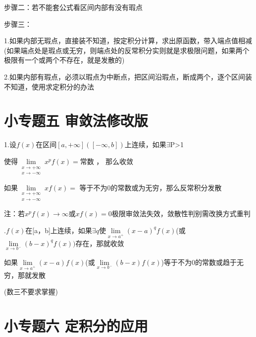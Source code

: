 \documentclass[a4paper,11pt]{book}
\begin{document}
\vspace{2ex}

\noindent 步骤二：若不能套公式看区间内部有没有瑕点

\noindent 步骤三：

1.如果内部无瑕点，直接装不知道，按定积分计算，求出原函数，带入端点值相减(如果端点处是瑕点或无穷，则端点处的反常积分实则就是求极限问题，如果两个极限有一个或两个不存在，就是发散的)

2.如果内部有瑕点，必须以瑕点为中断点，把区间沿瑕点，断成两个，逐个区间装不知道，使用求定积分的办法

\section*{小专题五 \quad 审敛法修改版}

1.设$f(x)$在区间$[a,+\infty]([-\infty,b])$上连续，如果$\exists$P>1

\vspace{2ex}

使得$\displaystyle{\lim \limits_{\substack{x \rightarrow+\infty\\x \rightarrow -\infty}} x^{p} f(x)=}$常数 ， 那么收敛

\vspace{2ex}

如果$\displaystyle{\lim \limits_{\substack{x \rightarrow+\infty\\x \rightarrow -\infty}} x f(x)=}$ 等于不为0的常数或为无穷，那么反常积分发散

注：若$x^{p}f(x)\rightarrow \infty$或$xf(x)=0$极限审敛法失效，敛散性判别需改换方式重判

\vspace{2ex}

.$f(x)$在[a，b]上连续，如果$\exists q$使$\lim \limits_{x \rightarrow a^{+}}(x-a)^{q}f(x)$(或$\lim \limits_{x \rightarrow b^{-}}(b-x)^{q}f(x))$存在，那就收敛

\vspace{2ex}

如果$\lim \limits _{x \rightarrow a^{+}}(x-a)f(x)$(或$\lim \limits _{x \rightarrow b^{-}}(b-x)f(x)$)等于不为0的常数或趋于无穷，那就发散

(数三不要求掌握)

\section*{小专题六 \quad 定积分的应用}

\vspace{3ex}
\end{document}
